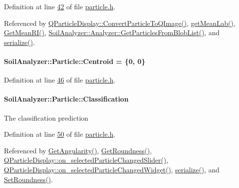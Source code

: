 Definition at line \hyperlink{particle_8h_source_l00042}{42} of file \hyperlink{particle_8h_source}{particle.\+h}.



Referenced by \hyperlink{qparticledisplay_8cpp_source_l00050}{Q\+Particle\+Display\+::\+Convert\+Particle\+To\+Q\+Image()}, \hyperlink{particle_8cpp_source_l00096}{get\+Mean\+Lab()}, \hyperlink{particle_8cpp_source_l00120}{Get\+Mean\+R\+I()}, \hyperlink{analyzer_8cpp_source_l00322}{Soil\+Analyzer\+::\+Analyzer\+::\+Get\+Particles\+From\+Blob\+List()}, and \hyperlink{particle_8h_source_l00083}{serialize()}.

\hypertarget{class_soil_analyzer_1_1_particle_a2a6ccf71f20c6a2e3a18e6cf04c887dc}{}
\paragraph[{Centroid}]{ Soil\+Analyzer\+::\+Particle\+::\+Centroid = \{0, 0\}}\label{class_soil_analyzer_1_1_particle_a2a6ccf71f20c6a2e3a18e6cf04c887dc}


Definition at line \hyperlink{particle_8h_source_l00046}{46} of file \hyperlink{particle_8h_source}{particle.\+h}.

\hypertarget{class_soil_analyzer_1_1_particle_aaa5091f3028af9e5ff9aee5548c8783c}{}
\paragraph[{Classification}]{ Soil\+Analyzer\+::\+Particle\+::\+Classification}\label{class_soil_analyzer_1_1_particle_aaa5091f3028af9e5ff9aee5548c8783c}
The classification prediction 

Definition at line \hyperlink{particle_8h_source_l00050}{50} of file \hyperlink{particle_8h_source}{particle.\+h}.



Referenced by \hyperlink{particle_8cpp_source_l00079}{Get\+Angularity()}, \hyperlink{particle_8cpp_source_l00084}{Get\+Roundness()}, \hyperlink{qparticledisplay_8cpp_source_l00124}{Q\+Particle\+Display\+::on\+\_\+selected\+Particle\+Changed\+Slider()}, \hyperlink{qparticledisplay_8cpp_source_l00110}{Q\+Particle\+Display\+::on\+\_\+selected\+Particle\+Changed\+Widget()}, \hyperlink{particle_8h_source_l00083}{serialize()}, and \hyperlink{particle_8cpp_source_l00089}{Set\+Roundness()}.

